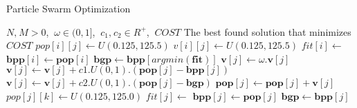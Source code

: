 \begin{algorithm}[ht]
\caption{Particle Swarm Optimization}
\label{alg:pso}
\begin{algorithmic}
\Require $N\text{,}\:M > 0$,  $\:\omega \in (0,1]$, $\:c_1\text{,}\:c_2 \in R^+ $, $\:COST$
\Ensure The best found solution that minimizes $COST$
\State $pop[i][j] \gets U(0.125,125.5)$ 
\State $v[i][j] \gets U(0.125,125.5)$
\EndFor
\State $fit[i] \gets$ 
\State $\boldsymbol{bpp}[i] \gets \boldsymbol{pop}[i]$ 
\EndFor
\State $\boldsymbol{bgp} \gets \boldsymbol{bpp}[argmin(\boldsymbol{fit})]$
\State $\boldsymbol{v}[j] \gets \omega.\boldsymbol{v}[j]$
\State $\boldsymbol{v}[j] \gets \boldsymbol{v}[j] + c1.U(0,1).(\boldsymbol{pop}[j] - \boldsymbol{bpp}[j])$
\State $\boldsymbol{v}[j] \gets \boldsymbol{v}[j] + c2.U(0,1).(\boldsymbol{pop}[j] - \boldsymbol{bgp})$
\State $\boldsymbol{pop}[j] \gets \boldsymbol{pop}[j] + \boldsymbol{v}[j]$
\State $pop[j][k] \gets U(0.125,125.0)$
\EndIf
\EndFor
\State $fit[j] \gets$ 
\State $\boldsymbol{bpp}[j] \gets \boldsymbol{pop}[j]$
\EndIf
{}
\State $\boldsymbol{bgp} \gets \boldsymbol{bpp}[j]$
\EndIf
\EndFor
\EndFor
\end{algorithmic}
\end{algorithm}
